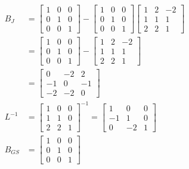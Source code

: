 \documentclass[11pt, letterpaper]{article}
\begin{document}
\begin{align*}
    B_J&=
    \begin{bmatrix}
        1 & 0 & 0 \\
        0 & 1 & 0\\
        0 & 0 & 1
    \end{bmatrix}
    -
    \begin{bmatrix}
        1 & 0 & 0\\
        0 & 1 & 0\\
        0 & 0 & 1
    \end{bmatrix}
    \begin{bmatrix}
        1 & 2 & -2\\
        1 & 1 & 1\\
        2 & 2 & 1
    \end{bmatrix}\\
    &=
    \begin{bmatrix}
        1 & 0 & 0 \\
        0 & 1 & 0\\
        0 & 0 & 1
    \end{bmatrix}
    -
    \begin{bmatrix}
        1 & 2 & -2\\
        1 & 1 & 1\\
        2 & 2 & 1
    \end{bmatrix}\\
    &=
    \begin{bmatrix}
        0 & -2 & 2\\
        -1 & 0 & -1\\
        -2 & -2 & 0
    \end{bmatrix}\\
    L^{-1}&=
    \begin{bmatrix}
        1 & 0 & 0\\
        1 & 1 & 0\\
        2 & 2 & 1
    \end{bmatrix}^{-1}
    =
    \begin{bmatrix}
        1 & 0 & 0\\
        -1 & 1 & 0\\
        0 & -2 & 1 
    \end{bmatrix}\\
    B_{GS}&=
    \begin{bmatrix}
        1 & 0 & 0 \\
        0 & 1 & 0\\
        0 & 0 & 1
    \end{bmatrix}

\end{align*}
\end{document}
